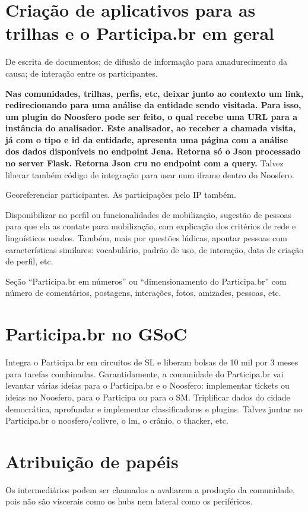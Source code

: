 \documentclass[12pt]{report}
\begin{document}
\chapter{Criação de aplicativos para as trilhas e o Participa.br em geral}
De escrita de documentos; de difusão de informação para amadurecimento da causa; de interação entre os participantes.

{\bf Nas comunidades, trilhas, perfis, etc, deixar junto ao contexto um link, redirecionando para uma análise da entidade sendo visitada. Para isso, um plugin do Noosfero pode ser feito, o qual recebe uma URL para a instância do analisador. Este analisador, ao receber a chamada visita, já com o tipo e id da entidade, apresenta uma página com a análise dos dados disponíveis no endpoint Jena. Retorna só o Json processado no server Flask. Retorna Json cru no endpoint com a query.} Talvez liberar também código de integração para usar num iframe dentro do Noosfero.

Georeferenciar participantes. As participações pelo IP também.

Disponibilizar no perfil ou funcionalidades de mobilização, sugestão de pessoas para que ela as contate para mobilização, com explicação dos critérios de rede e linguísticos usados. Também, mais por questões lúdicas, apontar pessoas com características similares: vocabulário, padrão de uso, de interação, data de criação de perfil, etc.

Seção ``Participa.br em números'' ou ``dimensionamento do Participa.br'' com número de comentários, postagens, interações, fotos, amizades, pessoas, etc.

\chapter{Participa.br no GSoC}
Integra o Participa.br em circuitos de SL e liberam bolsas de 10 mil por 3 meses para tarefas combinadas. Garantidamente, a comunidade do Participa.br vai levantar várias ideias para o Participa.br e o Noosfero: implementar tickets ou ideias no Noosfero, para o Participa ou para o SM. Triplificar dados do cidade democrática, aprofundar e implementar classificadores e plugins. Talvez juntar no Participa.br o noosfero/colivre, o lm, o crânio, o thacker, etc.

\chapter{Atribuição de papéis}
Os intermediários podem ser chamados a avaliarem a produção da comunidade, pois não são víscerais como os hubs nem lateral como os periféricos.
\end{document}

